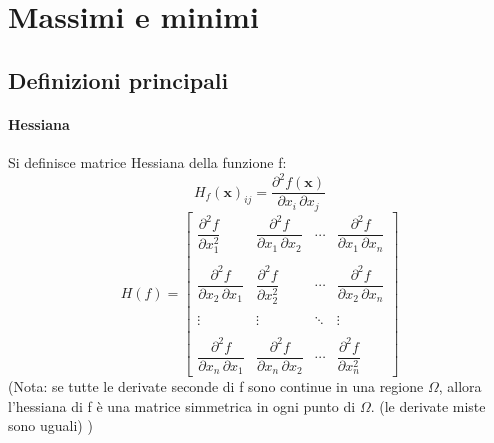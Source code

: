 \documentclass[a4paper,10pt]{book}
\begin{document}
\section{Massimi e minimi}
\subsection{Definizioni principali}

\paragraph{Hessiana}
Si definisce matrice Hessiana della funzione f:
$$  H_{f}(\mathbf{x})_{ij} = \frac{\partial^2 f(\mathbf{x})}{\partial x_i\, \partial x_j} $$
$$ H(f) = \begin{bmatrix} \dfrac{\partial^2 f}{\partial x_1^2} & \dfrac{\partial^2 f}{\partial x_1\,\partial x_2} & \cdots & \dfrac{\partial^2 f}{\partial x_1\,\partial x_n} \\ \\ \dfrac{\partial^2 f}{\partial x_2\,\partial x_1} & \dfrac{\partial^2 f}{\partial x_2^2} & \cdots & \dfrac{\partial^2 f}{\partial x_2\,\partial x_n} \\ \\ \vdots & \vdots & \ddots & \vdots \\ \\ \dfrac{\partial^2 f}{\partial x_n\,\partial x_1} & \dfrac{\partial^2 f}{\partial x_n\,\partial x_2} & \cdots & \dfrac{\partial^2 f}{\partial x_n^2} \end{bmatrix}$$
(Nota: se tutte le derivate seconde di f sono continue in una regione $\Omega$, allora l'hessiana di f è una matrice simmetrica in ogni punto di $\Omega$. (le derivate miste sono uguali) )
\end{document}
